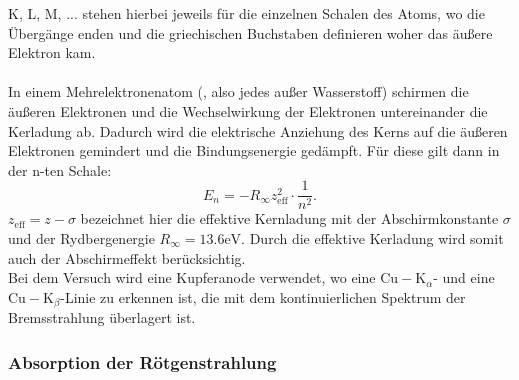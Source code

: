 K, L, M, ... stehen hierbei jeweils für die einzelnen Schalen des Atoms, wo die Übergänge
enden und die griechischen Buchstaben definieren woher das äußere Elektron kam.\\
\\
In einem Mehrelektronenatom (, also jedes außer Wasserstoff) schirmen die äußeren
Elektronen und die Wechselwirkung der Elektronen untereinander die Kerladung ab. Dadurch
wird die elektrische Anziehung des Kerns auf die äußeren Elektronen gemindert und die Bindungsenergie
gedämpft. Für diese gilt dann in der n-ten Schale:
\begin{equation}
    \label{eqn:Bindungsenergie}
    E_n = -R_{\infty} z_{\mathrm{eff}}^2 \cdot \frac{1}{n^2}.
\end{equation}
$z_{\mathrm{eff}} = z - \sigma$ bezeichnet hier die effektive Kernladung mit der 
Abschirmkonstante $\sigma$ und der Rydbergenergie $R_{\infty} = 13.6 \si{\electronvolt}$.
Durch die effektive Kerladung wird somit auch der Abschirmeffekt berücksichtig.\\
Bei dem Versuch wird eine Kupferanode verwendet, wo eine $\mathrm{Cu-K}_\alpha$- und eine
$\mathrm{Cu-K}_\beta$-Linie zu erkennen ist, die mit dem kontinuierlichen Spektrum der
Bremsstrahlung überlagert ist.

\subsubsection{Absorption der Rötgenstrahlung}

